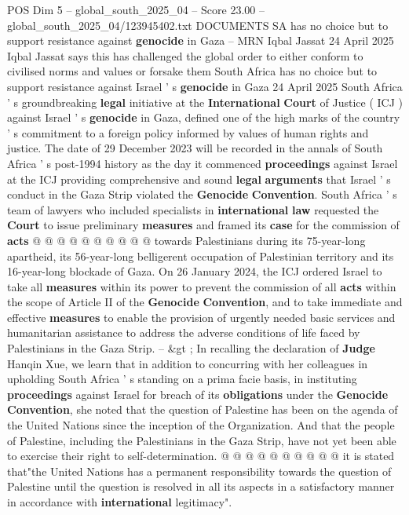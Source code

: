 \begin{textsample}{POS Dim 5 – global\_south\_2025\_04 – Score 23.00 – global\_south\_2025\_04/123945402.txt}  \label{ex:f5_pos_061}
DOCUMENTS SA has no choice but to support resistance against \textbf{genocide} in Gaza -- MRN Iqbal Jassat 24 April 2025 Iqbal Jassat says this has challenged the global order to either conform to civilised norms and values or forsake them South Africa has no choice but to support resistance against Israel ' s \textbf{genocide} in Gaza 24 April 2025 South Africa ' s groundbreaking \textbf{legal} initiative at the \textbf{International} \textbf{Court} of Justice ( ICJ ) against Israel ' s \textbf{genocide} in Gaza, defined one of the high marks of the country ' s commitment to a foreign policy informed by values of human rights and justice.
The date of 29 December 2023 will be recorded in the annals of South Africa ' s post-1994 history as the day it commenced \textbf{proceedings} against Israel at the ICJ providing comprehensive and sound \textbf{legal} \textbf{arguments} that Israel ' s conduct in the Gaza Strip violated the \textbf{Genocide} \textbf{Convention}.
South Africa ' s team of lawyers who included specialists in \textbf{international} \textbf{law} requested the \textbf{Court} to issue preliminary \textbf{measures} and framed its \textbf{case} for the commission of \textbf{acts} @ @ @ @ @ @ @ @ @ @ towards Palestinians during its 75-year-long apartheid, its 56-year-long belligerent occupation of Palestinian territory and its 16-year-long blockade of Gaza.
On 26 January 2024, the ICJ ordered Israel to take all \textbf{measures} within its power to prevent the commission of all \textbf{acts} within the scope of Article II of the \textbf{Genocide} \textbf{Convention}, and to take immediate and effective \textbf{measures} to enable the provision of urgently needed basic services and humanitarian assistance to address the adverse conditions of life faced by Palestinians in the Gaza Strip. -- \&gt ; In recalling the declaration of \textbf{Judge} Hanqin Xue, we learn that in addition to concurring with her colleagues in upholding South Africa ' s standing on a prima facie basis, in instituting \textbf{proceedings} against Israel for breach of its \textbf{obligations} under the \textbf{Genocide} \textbf{Convention}, she noted that the question of Palestine has been on the agenda of the United Nations since the inception of the Organization.
And that the people of Palestine, including the Palestinians in the Gaza Strip, have not yet been able to exercise their right to self-determination. @ @ @ @ @ @ @ @ @ @ it is stated that"the United Nations has a permanent responsibility towards the question of Palestine until the question is resolved in all its aspects in a satisfactory manner in accordance with \textbf{international} legitimacy".

\end{textsample}
